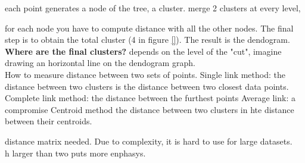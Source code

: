 each point generates a node of the tree, a cluster. merge 2 clusters at every level, 

for each node you have to compute distance with all the other nodes. The final step is to obtain the total cluster (4 in figure \ref{}). The result is the dendogram.\\

\textbf{Where are the final clusters?} depends on the level of the "cut", imagine drawing an horizontal line on the dendogram graph. \\

How to measure distance between two sets of points. 
Single link method: the distance between two clusters is the distance between two closest data points. 
Complete link method: the distance between the furthest points
Average link: a compromise
Centroid method the distance between two clusters in hte distance between their centroids. 

distance matrix needed. Due to complexity, it is hard to use for large datasets.\\

h larger than two puts more enphasys.  


